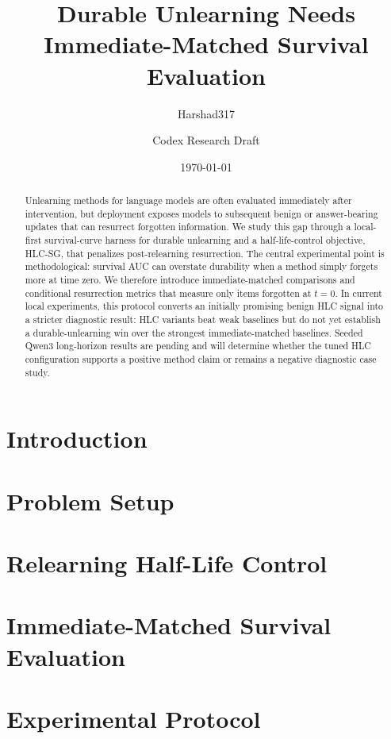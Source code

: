 \documentclass[11pt]{article}
\title{Durable Unlearning Needs Immediate-Matched Survival Evaluation}
\author{Harshad317 \and Codex Research Draft}
\date{\today}
\newcommand{\method}{HLC-SG}
\begin{document}
\maketitle

\begin{abstract}
Unlearning methods for language models are often evaluated immediately after intervention, but deployment exposes models to subsequent benign or answer-bearing updates that can resurrect forgotten information.
We study this gap through a local-first survival-curve harness for durable unlearning and a half-life-control objective, \method, that penalizes post-relearning resurrection.
The central experimental point is methodological: survival AUC can overstate durability when a method simply forgets more at time zero.
We therefore introduce immediate-matched comparisons and conditional resurrection metrics that measure only items forgotten at $t=0$.
In current local experiments, this protocol converts an initially promising benign HLC signal into a stricter diagnostic result: HLC variants beat weak baselines but do not yet establish a durable-unlearning win over the strongest immediate-matched baselines.
Seeded Qwen3 long-horizon results are pending and will determine whether the tuned HLC configuration supports a positive method claim or remains a negative diagnostic case study.
\end{abstract}

\section{Introduction}


\section{Problem Setup}


\section{Relearning Half-Life Control}


\section{Immediate-Matched Survival Evaluation}


\section{Experimental Protocol}

\end{document}
